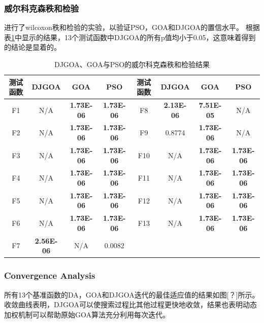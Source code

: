 \subsubsection{威尔科克森秩和检验}
进行了wilcoxon秩和检验的实验，以验证PSO，GOA和DJGOA的置信水平。 根据表\ref{tab:wilcoxon_rank_sum_test_DJGOA}中显示的结果，13个测试函数中DJGOA的所有p值均小于0.05，这意味着得到的结论是显着的。
\begin{table}[!htbp]
    \centering
    \caption{DJGOA、GOA与PSO的威尔科克森秩和检验结果}
    \label{tab:wilcoxon_rank_sum_test_DJGOA}
    \renewcommand\arraystretch{1.5} 
\begin{tabular}{c c c c || c c c c}
  \hline
  测试函数 & DJGOA & GOA & PSO &测试函数 & DJGOA & GOA & PSO\\
  \hline
  F1 & N/A & \textbf{1.73E-06}&\textbf{1.73E-06}&F8 & \textbf{2.13E-06} & \textbf{7.51E-05}&N/A \\
  \hline
  F2 & N/A & \textbf{1.73E-06}&\textbf{1.73E-06}&F9 & 0.8774 &\textbf{1.73E-06} &N/A \\
  \hline
  F3 & N/A & \textbf{1.73E-06}&\textbf{1.73E-06}&F10 & N/A & \textbf{1.73E-06}&\textbf{1.73E-06} \\
  \hline
  F4 & N/A & \textbf{1.73E-06}&\textbf{1.73E-06}&F11 & N/A & \textbf{1.73E-06}&\textbf{1.73E-06} \\
  \hline
  F5 & N/A & \textbf{1.73E-06}&\textbf{1.73E-06}&F12 & N/A & \textbf{1.73E-06}&\textbf{1.73E-06} \\
  \hline
  F6 & N/A & \textbf{1.73E-06}&\textbf{1.73E-06}&F13 & N/A & \textbf{1.73E-06}&\textbf{1.73E-06} \\
  \hline
  F7 & \textbf{2.56E-06} & N/A&0.0082&  &   &  &  \\
  \hline
  
  \hline
\end{tabular}
\end{table}


\subsubsection{Convergence Analysis}
所有13个基准函数的DA，GOA和DJGOA迭代的最佳适应值的结果如图[？]所示。 收敛曲线表明，DJGOA可以使搜索过程比其他过程更快地收敛，结果也表明动态加权机制可以帮助原始GOA算法充分利用每次迭代。


